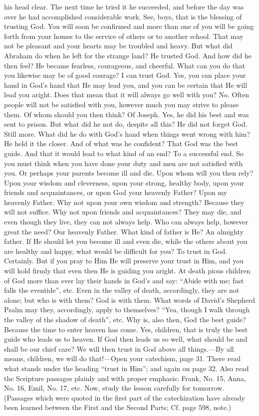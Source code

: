 his head clear. The next time he tried it he succeeded, and before the day was over he had accomplished considerable work. See, boys, that is the blessing of trusting God. You will soon be confirmed and more than one of you will be going forth from your homes to the service of others or to another school. That may not be pleasant and your hearts may be troubled and heavy. But what did Abraham do when he left for the strange land? He trusted God. And how did he then feel? He became fearless, courageous, and cheerful. What can you do that you likewise may be of good courage? I can trust God. Yes, you can place your hand in God’s hand that He may lead you, and you can be certain that He will lead you aright. Does that mean that it will always go well with you? No. Often people will not be satisfied with you, however much you may strive to please them. Of whom should you then think? Of Joseph. Yes, he did his best and was sent to prison. But what did he not do, despite all this? He did not forget God. Still more. What did he do with God’s hand when things went wrong with him? He held it the closer. And of what was he confident? That God was the best guide. And that it would lead to what kind of an end? To a successful end. So you must think when you have done your duty and men are not satisfied with you. Or perhaps your parents become ill and die. Upon whom will you then rely? Upon your wisdom and cleverness, upon your strong, healthy body, upon your friends and acquaintances, or upon God your heavenly Father? Upon my heavenly Father. Why not upon your own wisdom and strength? Because they will not suffice. Why not upon friends and acquaintances? They may die, and even though they live, they can not always help. Who can always help, however great the need? Our heavenly Father. What kind of father is He? An almighty father. If He should let you become ill and even die, while the others about you are healthy and happy, what would be difficult for you? To trust in God. Certainly. But if you pray to Him He will preserve your trust in Him, and you will hold firmly that even then He is guiding you aright. At death pious children of God more than ever lay their hands in God’s and say: “Abide with me; fast falls the eventide”, etc. Even in the valley of death, accordingly, they are not alone; but who is with them? God is with them. What words of David’s Shepherd Psalm may they, accordingly, apply to themselves? “Yea, though I walk through the valley of the shadow of death”, etc. Why is, also then, God
the best guide? Because the time to enter heaven has come. Yes, children, that is truly the best guide who leads us to heaven. If God then leads us so well, what should be and shall be our chief care? We will then trust in God above all things.—By all means, children, we will do that!—Open your catechism, page 31. There read what stands under the heading “trust in Him”; and again on page 32. Also read the Scripture passages plainly and with proper emphasis: Frank, No. 15, Anna, No. 16, Emil, No. 17, etc. Now, study the lesson carefully for tomorrow. (Passages which were quoted in the first part of the catechization have already been learned between the First and the Second Parts; Cf. page 598, note.)

